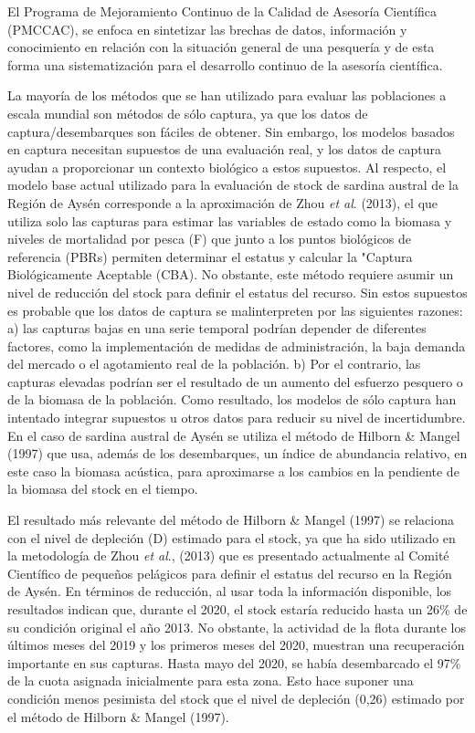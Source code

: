 \documentclass[
  spanish,
]{article}
\begin{document}
El Programa de Mejoramiento Continuo de la Calidad de Asesoría
Científica (PMCCAC), se enfoca en sintetizar las brechas de datos,
información y conocimiento en relación con la situación general de una
pesquería y de esta forma una sistematización para el desarrollo
continuo de la asesoría científica.

La mayoría de los métodos que se han utilizado para evaluar las
poblaciones a escala mundial son métodos de sólo captura, ya que los
datos de captura/desembarques son fáciles de obtener. Sin embargo, los
modelos basados en captura necesitan supuestos de una evaluación real, y
los datos de captura ayudan a proporcionar un contexto biológico a estos
supuestos. Al respecto, el modelo base actual utilizado para la
evaluación de stock de sardina austral de la Región de Aysén corresponde
a la aproximación de Zhou \emph{et al}. (2013), el que utiliza solo las
capturas para estimar las variables de estado como la biomasa y niveles
de mortalidad por pesca (F) que junto a los puntos biológicos de
referencia (PBRs) permiten determinar el estatus y calcular la "Captura
Biológicamente Aceptable (CBA). No obstante, este método requiere asumir
un nivel de reducción del stock para definir el estatus del recurso. Sin
estos supuestos es probable que los datos de captura se malinterpreten
por las siguientes razones: a) las capturas bajas en una serie temporal
podrían depender de diferentes factores, como la implementación de
medidas de administración, la baja demanda del mercado o el agotamiento
real de la población. b) Por el contrario, las capturas elevadas podrían
ser el resultado de un aumento del esfuerzo pesquero o de la biomasa de
la población. Como resultado, los modelos de sólo captura han intentado
integrar supuestos u otros datos para reducir su nivel de incertidumbre.
En el caso de sardina austral de Aysén se utiliza el método de Hilborn
\& Mangel (1997) que usa, además de los desembarques, un índice de
abundancia relativo, en este caso la biomasa acústica, para aproximarse
a los cambios en la pendiente de la biomasa del stock en el tiempo.

El resultado más relevante del método de Hilborn \& Mangel (1997) se
relaciona con el nivel de depleción (D) estimado para el stock, ya que
ha sido utilizado en la metodología de Zhou \emph{et al}., (2013) que es
presentado actualmente al Comité Científico de pequeños pelágicos para
definir el estatus del recurso en la Región de Aysén. En términos de
reducción, al usar toda la información disponible, los resultados
indican que, durante el 2020, el stock estaría reducido hasta un 26\% de
su condición original el año 2013. No obstante, la actividad de la flota
durante los últimos meses del 2019 y los primeros meses del 2020,
muestran una recuperación importante en sus capturas. Hasta mayo del
2020, se había desembarcado el 97\% de la cuota asignada inicialmente
para esta zona. Esto hace suponer una condición menos pesimista del
stock que el nivel de depleción (0,26) estimado por el método de Hilborn
\& Mangel (1997).
\end{document}

